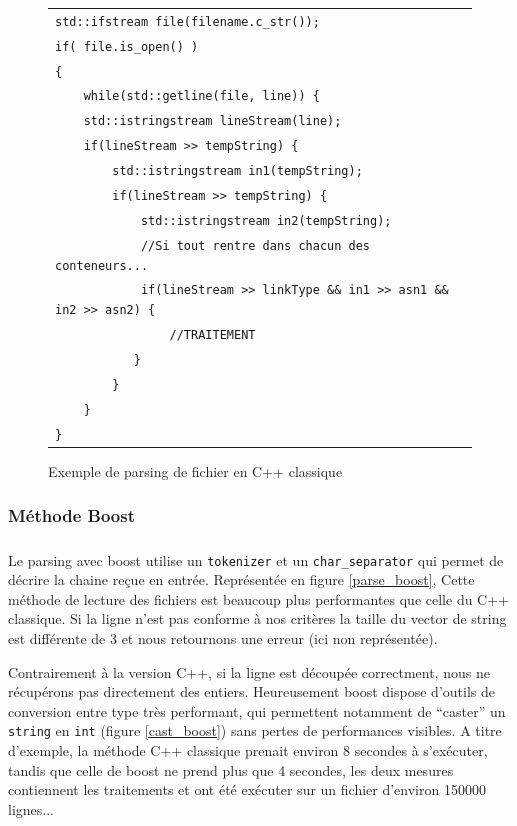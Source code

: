 \begin{figure}[H]
   \begin{center}
      \begin{tabular}{l}
        \hline 
        \verb|std::ifstream file(filename.c_str());|\\
	\verb|if( file.is_open() )|\\
	\verb|{|\\
   	\verb|    while(std::getline(file, line)) {|\\
      	\verb|    std::istringstream lineStream(line);|\\
      	\verb|    if(lineStream >> tempString) {|\\
        \verb|        std::istringstream in1(tempString);|\\
        \verb|        if(lineStream >> tempString) {|\\
        \verb|            std::istringstream in2(tempString);|\\
        \verb|            //Si tout rentre dans chacun des conteneurs...|\\
        \verb|            if(lineStream >> linkType && in1 >> asn1 && in2 >> asn2) {|\\
        \verb|                //TRAITEMENT|\\
        \verb|           }|\\
        \verb|        }|\\
        \verb|    }|\\
        \verb|}|\\
        \hline
      \end{tabular}
   \end{center}
\caption{\label{parse_cpp} Exemple de parsing de fichier en C++ classique}
\end{figure}




\subsubsection{Méthode Boost}
\subparagraph{}
Le parsing avec boost utilise un \verb|tokenizer| et un \verb|char_separator| qui permet de décrire la chaine re\c cue en entrée. Représentée en figure \ref{parse_boost}, Cette méthode de lecture des fichiers est beaucoup plus performantes que celle du C++ classique. Si la ligne n'est pas conforme à nos critères la taille du vector de string est différente de 3 et nous retournons une erreur (ici non représentée). 

Contrairement à la version C++, si la ligne est découpée correctment, nous ne récupérons pas directement des entiers. Heureusement boost dispose d'outils de conversion entre type très performant, qui permettent notamment de ``caster'' un \verb|string| en \verb|int| (figure \ref{cast_boost}) sans pertes de performances visibles. A titre d'exemple, la méthode C++ classique prenait environ 8 secondes à s'exécuter, tandis que celle de boost ne prend plus que 4 secondes, les deux mesures contiennent les traitements et ont été exécuter sur un fichier d'environ 150000 lignes...

